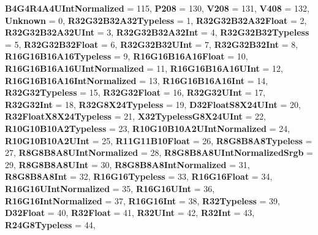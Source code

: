 \begin{DoxyCompactItemize}
{\bfseries B4\+G4\+R4\+A4\+U\+Int\+Normalized} = 115, 
{\bfseries P208} = 130, 
{\bfseries V208} = 131, 
\newline
{\bfseries V408} = 132, 
{\bfseries Unknown} = 0, 
{\bfseries R32\+G32\+B32\+A32\+Typeless} = 1, 
{\bfseries R32\+G32\+B32\+A32\+Float} = 2, 
\newline
{\bfseries R32\+G32\+B32\+A32\+U\+Int} = 3, 
{\bfseries R32\+G32\+B32\+A32\+Int} = 4, 
{\bfseries R32\+G32\+B32\+Typeless} = 5, 
{\bfseries R32\+G32\+B32\+Float} = 6, 
\newline
{\bfseries R32\+G32\+B32\+U\+Int} = 7, 
{\bfseries R32\+G32\+B32\+Int} = 8, 
{\bfseries R16\+G16\+B16\+A16\+Typeless} = 9, 
{\bfseries R16\+G16\+B16\+A16\+Float} = 10, 
\newline
{\bfseries R16\+G16\+B16\+A16\+U\+Int\+Normalized} = 11, 
{\bfseries R16\+G16\+B16\+A16\+U\+Int} = 12, 
{\bfseries R16\+G16\+B16\+A16\+Int\+Normalized} = 13, 
{\bfseries R16\+G16\+B16\+A16\+Int} = 14, 
\newline
{\bfseries R32\+G32\+Typeless} = 15, 
{\bfseries R32\+G32\+Float} = 16, 
{\bfseries R32\+G32\+U\+Int} = 17, 
{\bfseries R32\+G32\+Int} = 18, 
\newline
{\bfseries R32\+G8\+X24\+Typeless} = 19, 
{\bfseries D32\+Float\+S8\+X24\+U\+Int} = 20, 
{\bfseries R32\+Float\+X8\+X24\+Typeless} = 21, 
{\bfseries X32\+Typeless\+G8\+X24\+U\+Int} = 22, 
\newline
{\bfseries R10\+G10\+B10\+A2\+Typeless} = 23, 
{\bfseries R10\+G10\+B10\+A2\+U\+Int\+Normalized} = 24, 
{\bfseries R10\+G10\+B10\+A2\+U\+Int} = 25, 
{\bfseries R11\+G11\+B10\+Float} = 26, 
\newline
{\bfseries R8\+G8\+B8\+A8\+Typeless} = 27, 
{\bfseries R8\+G8\+B8\+A8\+U\+Int\+Normalized} = 28, 
{\bfseries R8\+G8\+B8\+A8\+U\+Int\+Normalized\+Srgb} = 29, 
{\bfseries R8\+G8\+B8\+A8\+U\+Int} = 30, 
\newline
{\bfseries R8\+G8\+B8\+A8\+Int\+Normalized} = 31, 
{\bfseries R8\+G8\+B8\+A8\+Int} = 32, 
{\bfseries R16\+G16\+Typeless} = 33, 
{\bfseries R16\+G16\+Float} = 34, 
\newline
{\bfseries R16\+G16\+U\+Int\+Normalized} = 35, 
{\bfseries R16\+G16\+U\+Int} = 36, 
{\bfseries R16\+G16\+Int\+Normalized} = 37, 
{\bfseries R16\+G16\+Int} = 38, 
\newline
{\bfseries R32\+Typeless} = 39, 
{\bfseries D32\+Float} = 40, 
{\bfseries R32\+Float} = 41, 
{\bfseries R32\+U\+Int} = 42, 
\newline
{\bfseries R32\+Int} = 43, 
{\bfseries R24\+G8\+Typeless} = 44, 

\end{DoxyCompactItemize}
